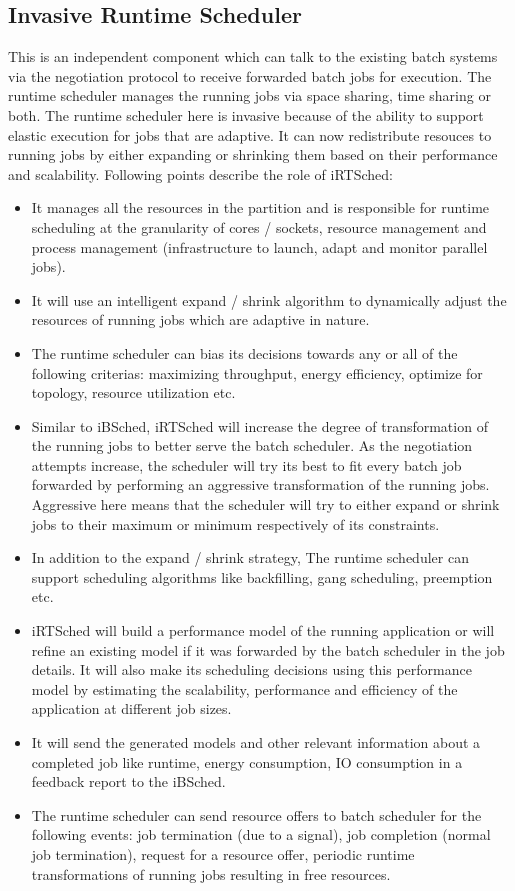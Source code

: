 \subsection{Invasive Runtime Scheduler}
This is an independent component which can talk to the existing batch systems via the negotiation protocol to receive forwarded batch jobs for execution. The runtime scheduler manages the running jobs via space sharing, time sharing or both. The runtime scheduler here is invasive because of the ability to support elastic execution for jobs that are adaptive. It can now redistribute resouces to running jobs by either expanding or shrinking them based on their performance and scalability. Following points describe the role of iRTSched:
\begin{itemize}
\item It manages all the resources in the partition and is responsible for runtime scheduling at the granularity of cores / sockets, resource management and process management (infrastructure to launch, adapt and monitor parallel jobs).
\item It will use an intelligent expand / shrink algorithm to dynamically adjust the resources of running jobs which are adaptive in nature. 
\item The runtime scheduler can bias its decisions towards any or all of the following criterias: maximizing throughput, energy efficiency, optimize for topology, resource utilization etc.
\item Similar to iBSched, iRTSched will increase the degree of transformation of the running jobs to better serve the batch scheduler. As the negotiation attempts increase, the scheduler will try its best to fit every batch job forwarded by performing an aggressive transformation of the running jobs. Aggressive here means that the scheduler will try to either expand or shrink jobs to their maximum or minimum respectively of its constraints.
\item In addition to the expand / shrink strategy, The runtime scheduler can support scheduling algorithms like backfilling, gang scheduling, preemption etc.
\item iRTSched will build a performance model of the running application or will refine an existing model if it was forwarded by the batch scheduler in the job details. It will also make its scheduling decisions using this performance model by estimating the scalability, performance and efficiency of the application at different job sizes.
\item It will send the generated models and other relevant information about a completed job like runtime, energy consumption, IO consumption in a feedback report to the iBSched.
\item The runtime scheduler can send resource offers to batch scheduler for the following events: job termination (due to a signal), job completion (normal job termination), request for a resource offer, periodic runtime transformations of running jobs resulting in free resources.
\end{itemize}
